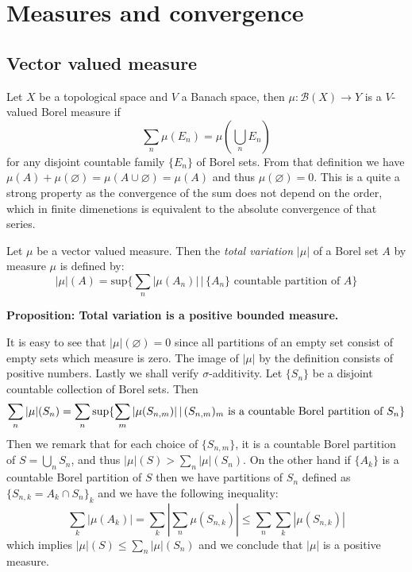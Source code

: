 \documentclass{article}
\begin{document}
\section{Measures and convergence}

\subsection{Vector valued measure}
Let $X$ be a topological space and $V$ a Banach space, then $\mu:\mathcal{B}(X)
\rightarrow Y$ is a $V$-valued Borel measure if
\[\sum_n\mu(E_n)=\mu(\bigcup_n E_n)\]
for any disjoint countable family $\{E_n\}$ of Borel sets. From that definition
we have $\mu(A)+\mu(\varnothing)=\mu(A\cup\varnothing)=\mu(A)$ and thus 
$\mu(\varnothing)=0$. This is a quite a strong property as the convergence of
the sum does not depend on the order, which in finite dimenetions is equivalent
to the absolute convergence of that series.

\vspace{1ex} Let $\mu$ be a vector valued measure. Then the \emph{total
variation} $|\mu|$ of a Borel set $A$  by measure $\mu$ is defined by:
\[|\mu|(A) = \text{sup}\{\sum_n|\mu(A_n)|\,|\,\{A_n\}\text{ countable partition of }A\}\]

\textbf{Proposition: Total variation is a positive bounded measure.}

\vspace{1ex}
It is easy to see that $|\mu|(\varnothing)=0$ since all partitions of an empty
set consist of empty sets which measure is zero. The image of $|\mu|$ by the
definition consists of positive numbers. Lastly we shall verify $\sigma$-additivity.
Let $\{S_n\}$ be a disjoint countable collection of Borel sets. Then
\[ 
    \sum_n|\mu|(S_n) = \sum_n\sup\{\sum_m|\mu(S_{n,m})|\,|\,(S_{n,m})_m\text{ is a countable Borel partition of }S_n\} \\ 
\]
Then we remark that for each choice of $\{S_{n,m}\}$, it is a countable Borel
partition of $S=\bigcup_n S_n$, and thus $|\mu|(S)>\sum_n|\mu|(S_n)$. On the
other hand if $\{A_k\}$ is a countable Borel partition of $S$ then we have
partitions of $S_n$ defined as $\{S_{n,k}=A_k\cap S_n\}_k$ and we have the
following inequality:
\[
    \sum_k|\mu(A_k)|=\sum_k|\sum_n\mu(S_{n,k})|\leq\sum_n\sum_k|\mu(S_{n,k})|
\]
which implies $|\mu|(S)\leq\sum_n|\mu|(S_n)$ and we conclude that $|\mu|$ is a
positive measure.
\end{document}
